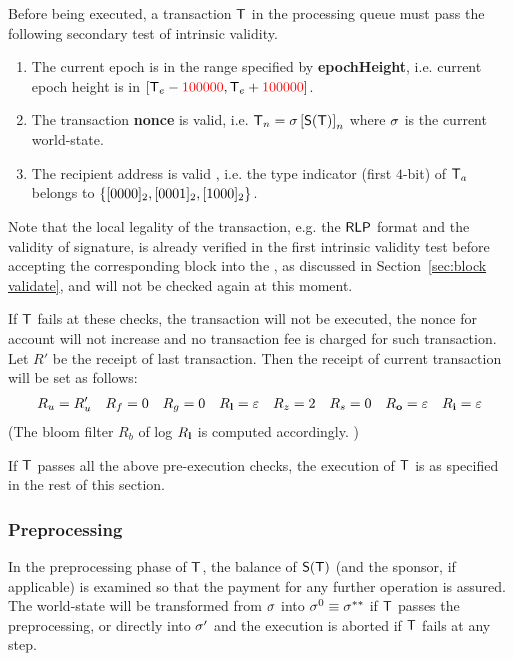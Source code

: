 Before being executed, a transaction $\textsf{T}$ in the processing queue must pass the following secondary test of intrinsic validity. 
\begin{enumerate}[nosep]
	\item The current epoch is in the range specified by \textbf{epochHeight}, 
	i.e. current epoch height is in $[\textsf{T}_e - {\color{red}100000}, \textsf{T}_e + {\color{red}100000}]$.
	
	\item The transaction \textbf{nonce} is valid,
   i.e. $\textsf{T}_n = \mathbf{\sigma}\left[\mathsf{S}{\left({\textsf{T}} \right)}\right]_n$ where $\mathbf{\sigma}$ is the current world-state.

   \item The recipient address is valid , i.e. the type indicator (first $4$-bit) of $\textsf{T}_a$ belongs to ${\left \{{[0000]_2,[0001]_2,[1000]_2} \right \}}$.
\end{enumerate}

Note that the local legality of the transaction, 
e.g. the $\mathsf{RLP}$ format
and the validity of signature, 
is already verified in the first intrinsic validity test before accepting the corresponding block into the \name \tg, as discussed in Section~\ref{sec:block validate},
and will not be checked again at this moment.

If $\textsf{T}$ fails at these checks, the transaction will not be executed, the nonce for account will not increase and no transaction fee is charged for such transaction. Let $R'$ be the receipt of last transaction.
Then the receipt of current transaction will be set as follows:
\begin{align}
	R_u=R'_u && R_f=0 && R_g=0 && R_{\bf l}=\mathbb{\varepsilon} && R_z=2 && R_s=0 && R_{\bf o}=\mathbb{\varepsilon} && R_{\bf i}=\mathbb{\varepsilon}
\end{align}
%
(The bloom filter $R_b$ of log $R_{\bf l}$ is computed accordingly. 
)


If $\textsf{T}$ passes all the above pre-execution checks, the execution of $\textsf{T}$ is as specified in the rest of this section.


\subsubsection{Preprocessing}
\label{subsubsec:preprocessing}

In the preprocessing phase of $\textsf{T}$, the balance of $\mathsf{S}{\left({\textsf{T}} \right)}$ (and the sponsor, if applicable) is examined so that the payment for any further operation is assured.
The world-state will be transformed from $\mathbf{\sigma}$ into $\mathbf{\sigma}^0\equiv \mathbf{\sigma}^{**}$ if $\textsf{T}$ passes the preprocessing, or directly into $\mathbf{\sigma}'$ and the execution is aborted if $\textsf{T}$ fails at any step.

